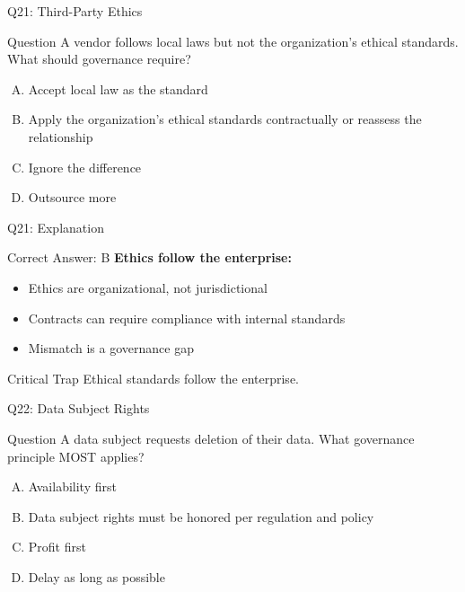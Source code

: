 \documentclass{beamer}
\begin{document}
	\begin{frame}{Q21: Third-Party Ethics}
		\begin{block}{Question}
			A vendor follows local laws but not the organization's ethical standards. What should governance require?
		\end{block}
		\begin{enumerate}[(A)]
			\item Accept local law as the standard
			\item Apply the organization's ethical standards contractually or reassess the relationship
			\item Ignore the difference
			\item Outsource more
		\end{enumerate}
	\end{frame}
	
	\begin{frame}{Q21: Explanation}
		\begin{block}{Correct Answer: B}
			\textbf{Ethics follow the enterprise:}
			\begin{itemize}
				\item Ethics are organizational, not jurisdictional
				\item Contracts can require compliance with internal standards
				\item Mismatch is a governance gap
			\end{itemize}
		\end{block}
		\begin{alertblock}{Critical Trap}
			Ethical standards follow the enterprise.
		\end{alertblock}
	\end{frame}
	
	\begin{frame}{Q22: Data Subject Rights}
		\begin{block}{Question}
			A data subject requests deletion of their data. What governance principle MOST applies?
		\end{block}
		\begin{enumerate}[(A)]
			\item Availability first
			\item Data subject rights must be honored per regulation and policy
			\item Profit first
			\item Delay as long as possible
		\end{enumerate}
	\end{frame}
	
\end{document}
